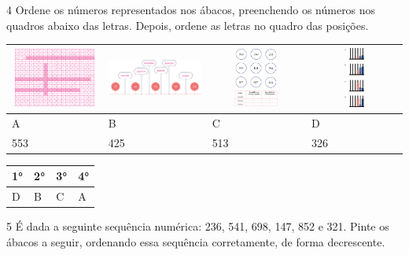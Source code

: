 
\num{4} Ordene os números representados nos ábacos, preenchendo os
números nos quadros abaixo das letras. Depois, ordene as letras no
quadro das posições.


\begin{longtable}[]{@{}llll@{}}
\toprule
\includegraphics[width=1.24938in,height=0.76667in]{media/image13.png} &
\includegraphics[width=1.35417in,height=0.78502in]{media/image14.png} &
\includegraphics[width=1.29167in,height=0.76677in]{media/image15.png} &
\includegraphics[width=1.25000in,height=0.78248in]{media/image16.png}\tabularnewline
\midrule
\endhead
A & B & C & D\tabularnewline
553 & 425 & 513 & 326\tabularnewline
\bottomrule
\end{longtable}

\begin{longtable}[]{@{}llll@{}}
\toprule
\textbf{1°} & \textbf{2°} & \textbf{3°} & \textbf{4°}\tabularnewline
\midrule
\endhead
D & B & C & A\tabularnewline
\bottomrule
\end{longtable}


\num{5} É dada a seguinte sequência numérica: 236, 541, 698, 147, 852 e 321. Pinte os
ábacos a seguir, ordenando essa sequência corretamente, de forma
decrescente.

